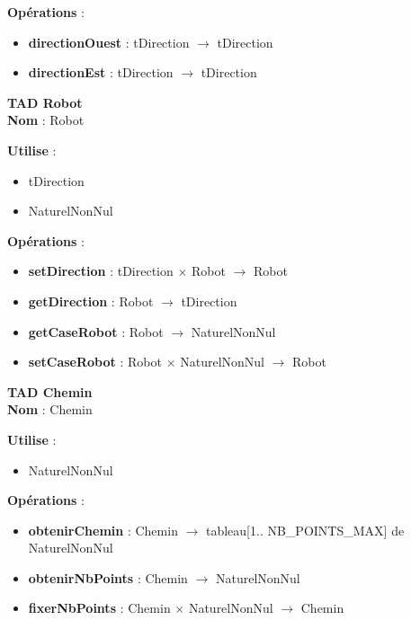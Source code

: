 \documentclass[11pt,a4paper]{article}
\begin{document}
\noindent\textbf{Opérations} :
\begin{itemize}
    \item \textbf{directionOuest} : tDirection $\rightarrow$ tDirection
    \item \textbf{directionEst} : tDirection $\rightarrow$ tDirection
\end{itemize}

\vspace{\baselineskip}

\textbf{TAD Robot}\\
\noindent\textbf{Nom} : Robot

\noindent\textbf{Utilise} :
\begin{itemize}
    \item tDirection
    \item NaturelNonNul
\end{itemize}
\noindent\textbf{Opérations} :
\begin{itemize}
    \item \textbf{setDirection} : tDirection $\times$ Robot $\rightarrow$ Robot
    \item \textbf{getDirection} : Robot $\rightarrow$ tDirection
    \item \textbf{getCaseRobot} : Robot $\rightarrow$ NaturelNonNul
    \item \textbf{setCaseRobot} : Robot $\times$ NaturelNonNul $\rightarrow$ Robot
\end{itemize}

\vspace{\baselineskip}

\textbf{TAD Chemin}\\
\noindent\textbf{Nom} : Chemin

\noindent\textbf{Utilise} :
\begin{itemize}
    \item NaturelNonNul
\end{itemize}
\noindent\textbf{Opérations} :
\begin{itemize}
    \item \textbf{obtenirChemin} : Chemin $\rightarrow$ tableau[1.. NB\_POINTS\_MAX] de NaturelNonNul 
    \item \textbf{obtenirNbPoints} : Chemin $\rightarrow$ NaturelNonNul
    \item \textbf{fixerNbPoints} : Chemin $\times$ NaturelNonNul $\rightarrow$ Chemin
\end{itemize}

\vspace{\baselineskip}
\end{document}
